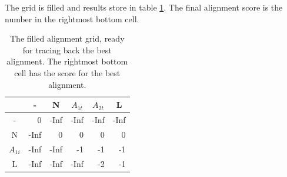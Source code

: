 The grid is filled and results store in table \ref{NW_full_table}.
The final alignment score is the number in the rightmost bottom cell.
\begin{table}[ht!]
\centering
\begin{tabular}{c|r|r|r|r|r|}
\rowcolor[HTML]{EFEFEF} 
                                 & \multicolumn{1}{c|}{\cellcolor[HTML]{EFEFEF}-} & \multicolumn{1}{c|}{\cellcolor[HTML]{EFEFEF}N} & \multicolumn{1}{c|}{\cellcolor[HTML]{EFEFEF}$A_{1t}$} & \multicolumn{1}{c|}{\cellcolor[HTML]{EFEFEF}$A_{2t}$} & \multicolumn{1}{c|}{\cellcolor[HTML]{EFEFEF}L} \\ \hline
\cellcolor[HTML]{EFEFEF}-        & 0                                              & -Inf                                            & -Inf                                                   & -Inf                                                   & -Inf                                            \\ \hline
\cellcolor[HTML]{EFEFEF}N        & -Inf                                            & 0                                              & 0                                                   & 0                                                   & 0                                            \\ \hline
\cellcolor[HTML]{EFEFEF}$A_{1i}$ & -Inf                                            & -Inf                                            & -1                                                     & -1                                                   & -1                                            \\ \hline
\cellcolor[HTML]{EFEFEF}L        & -Inf                                            & -Inf                                            & -Inf                                                   & -2                                                    & -1                                            \\ \hline
\end{tabular}
    \caption{
         \label{NW_full_table}
             The filled alignment grid, ready for tracing back the best alignment. The rightmost bottom cell has the score for the best alignment.
             }
\end{table}

